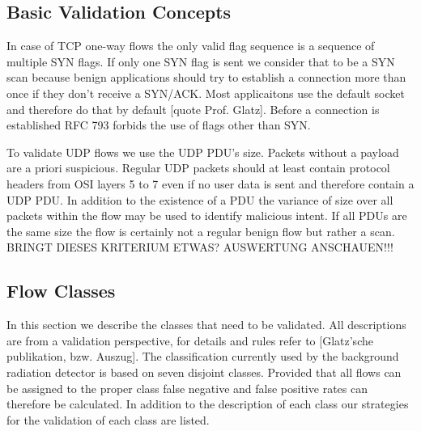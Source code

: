 \documentclass[a4paper]{scrartcl}
\begin{document}
\subsection{Basic Validation Concepts}
In case of TCP one-way flows the only valid flag sequence is a sequence of multiple SYN flags. If only one SYN flag is sent we consider that to be a SYN scan because benign applications should try to establish a connection more than once if they don't receive a SYN/ACK. Most applicaitons use the default socket and therefore do that by default [quote Prof. Glatz]. Before a connection is established RFC 793 \cite{rfc_tcp} forbids the use of flags other than SYN. 

To validate UDP flows we use the UDP PDU's size. Packets without a payload are a priori suspicious. Regular UDP packets should at least contain protocol headers from OSI layers 5 to 7 even if no user data is sent and therefore contain a UDP PDU.
In addition to the existence of a PDU the variance of size over all packets within the flow may be used to identify malicious intent. If all PDUs are the same size the flow is certainly not a regular benign flow but rather a scan. BRINGT DIESES KRITERIUM ETWAS? AUSWERTUNG ANSCHAUEN!!!

\subsection{Flow Classes}
In this section we describe the classes that need to be validated. All descriptions are from a validation perspective, for details and rules refer to [Glatz'sche publikation, bzw. Auszug]. The classification currently used by the background radiation detector is based on seven disjoint classes. Provided that all flows can be assigned to the proper class false negative and false positive rates can therefore be calculated. In addition to the description of each class our strategies for the validation of each class are listed.
\end{document}
